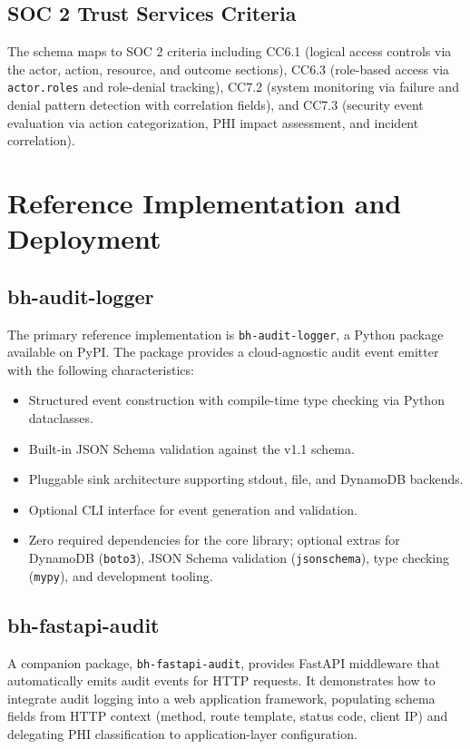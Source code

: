 \documentclass[11pt,a4paper]{article}
\begin{document}
\subsection{SOC 2 Trust Services Criteria}

The schema maps to SOC 2 criteria including CC6.1 (logical access controls via the actor, action, resource, and outcome sections), CC6.3 (role-based access via \texttt{actor.roles} and role-denial tracking), CC7.2 (system monitoring via failure and denial pattern detection with correlation fields), and CC7.3 (security event evaluation via action categorization, PHI impact assessment, and incident correlation).

\section{Reference Implementation and Deployment}

\subsection{bh-audit-logger}

The primary reference implementation is \texttt{bh-audit-logger}, a Python package available on PyPI. The package provides a cloud-agnostic audit event emitter with the following characteristics:

\begin{itemize}
    \item Structured event construction with compile-time type checking via Python dataclasses.
    \item Built-in JSON Schema validation against the v1.1 schema.
    \item Pluggable sink architecture supporting stdout, file, and DynamoDB backends.
    \item Optional CLI interface for event generation and validation.
    \item Zero required dependencies for the core library; optional extras for DynamoDB (\texttt{boto3}), JSON Schema validation (\texttt{jsonschema}), type checking (\texttt{mypy}), and development tooling.
\end{itemize}

\subsection{bh-fastapi-audit}

A companion package, \texttt{bh-fastapi-audit}, provides FastAPI middleware that automatically emits audit events for HTTP requests. It demonstrates how to integrate audit logging into a web application framework, populating schema fields from HTTP context (method, route template, status code, client IP) and delegating PHI classification to application-layer configuration.
\end{document}

